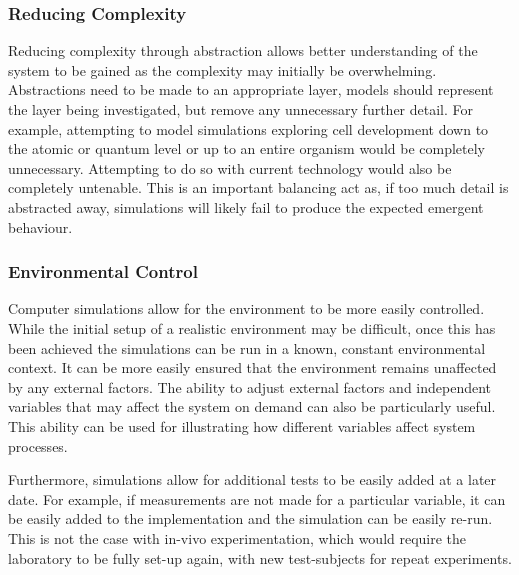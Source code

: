\documentclass{UoYCSproject}
\begin{document}
\subsubsection{Reducing Complexity}
Reducing complexity through abstraction allows better understanding of the system to be gained as the complexity may initially be overwhelming.
Abstractions need to be made to an appropriate layer, models should represent the layer being investigated, but remove any unnecessary further detail.
For example, attempting to model simulations exploring cell development down to the atomic or quantum level or up to an entire organism would be completely unnecessary.
Attempting to do so with current technology would also be completely untenable.
This is an important balancing act as, if too much detail is abstracted away, simulations will likely fail to produce the expected emergent behaviour\cite{stepney_abm}.

\subsubsection{Environmental Control}
Computer simulations allow for the environment to be more easily controlled.
While the initial setup of a realistic environment may be difficult, once this has been achieved the simulations can be run in a known, constant environmental context.
It can be more easily ensured that the environment remains unaffected by any external factors.
The ability to adjust external factors and independent variables that may affect the system on demand can also be particularly useful.
This ability can be used for illustrating how different variables affect system processes.


Furthermore, simulations allow for additional tests to be easily added at a later date.
For example, if measurements are not made for a particular variable, it can be easily added to the implementation and the simulation can be easily re-run.
This is not the case with in-vivo experimentation, which would require the laboratory to be fully set-up again, with new test-subjects for repeat experiments.
\end{document}
